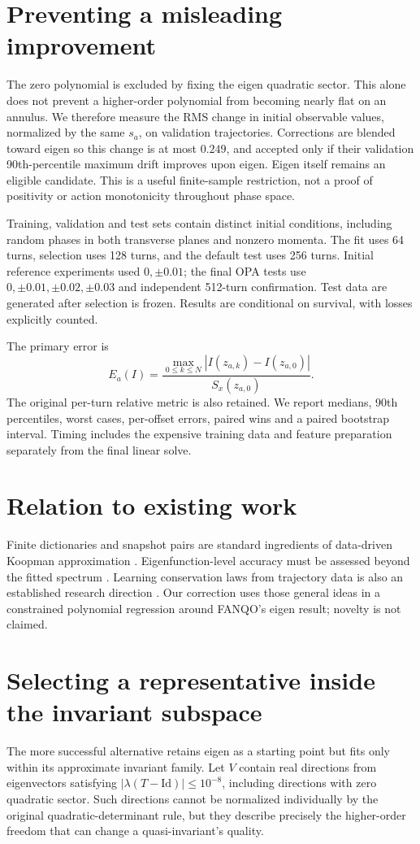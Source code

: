 \documentclass[11pt]{article}
\begin{document}
\section{Preventing a misleading improvement}
The zero polynomial is excluded by fixing the eigen quadratic sector. This alone does not prevent a higher-order polynomial from becoming nearly flat on an annulus. We therefore measure the RMS change in initial observable values, normalized by the same $s_a$, on validation trajectories. Corrections are blended toward eigen so this change is at most $0.249$, and accepted only if their validation 90th-percentile maximum drift improves upon eigen. Eigen itself remains an eligible candidate. This is a useful finite-sample restriction, not a proof of positivity or action monotonicity throughout phase space.

Training, validation and test sets contain distinct initial conditions, including random phases in both transverse planes and nonzero momenta. The fit uses 64 turns, selection uses 128 turns, and the default test uses 256 turns. Initial reference experiments used $0,\pm0.01$; the final OPA tests use $0,\pm0.01,\pm0.02,\pm0.03$ and independent 512-turn confirmation. Test data are generated after selection is frozen. Results are conditional on survival, with losses explicitly counted.

The primary error is
\[
 E_a(I)=\frac{\max_{0\leq k\leq N}|I(z_{a,k})-I(z_{a,0})|}{S_x(z_{a,0})}.
\]
The original per-turn relative metric is also retained. We report medians, 90th percentiles, worst cases, per-offset errors, paired wins and a paired bootstrap interval. Timing includes the expensive training data and feature preparation separately from the final linear solve.

\section{Relation to existing work}
Finite dictionaries and snapshot pairs are standard ingredients of data-driven Koopman approximation \cite{edmd}. Eigenfunction-level accuracy must be assessed beyond the fitted spectrum \cite{accuracy}. Learning conservation laws from trajectory data is also an established research direction \cite{poincare}. Our correction uses those general ideas in a constrained polynomial regression around FANQO's eigen result; novelty is not claimed.

\section{Selecting a representative inside the invariant subspace}
The more successful alternative retains eigen as a starting point but fits only within its approximate invariant family. Let $V$ contain real directions from eigenvectors satisfying $|\lambda(T-\mathrm{Id})|\leq10^{-8}$, including directions with zero quadratic sector. Such directions cannot be normalized individually by the original quadratic-determinant rule, but they describe precisely the higher-order freedom that can change a quasi-invariant's quality.
\end{document}
